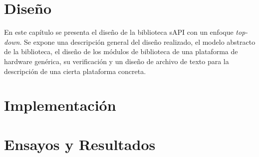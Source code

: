 \documentclass[
11pt, %
spanish,
singlespacing, %
parskip, %
headsepline, %
]{MastersDoctoralThesis} %
\begin{document}
\chapter{Diseño}
\label{ChapterDiseno}

En este capítulo se presenta el diseño de la biblioteca sAPI con un enfoque \emph{top-down}. Se expone una descripción general del diseño realizado, el modelo abstracto de la biblioteca, el diseño de los módulos de biblioteca de una plataforma de hardware genérica, su verificación y un diseño de archivo de texto para la descripción de una cierta plataforma concreta.























\chapter{Implementación}
\label{ChapterImplementacion}














\chapter{Ensayos y Resultados}
\label{ChapterEnsayosYResultados}
\end{document}
